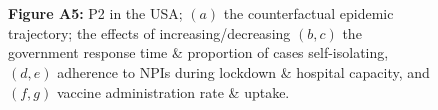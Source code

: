 \documentclass[paper=a4,fontsize=11pt]{article}
\begin{document}
\begin{figure}[!h]
  \\
  \hspace{1.76cm}
  \\
  \caption*{\textbf{Figure A5:} P2 in the USA; $(a)$ the counterfactual epidemic trajectory; the effects of increasing/decreasing $(b,c)$ the government response time \& proportion of cases self-isolating, $(d,e)$ adherence to NPIs during lockdown \& hospital capacity, and $(f,g)$ vaccine administration rate \& uptake.}
\end{figure}
\end{document}
